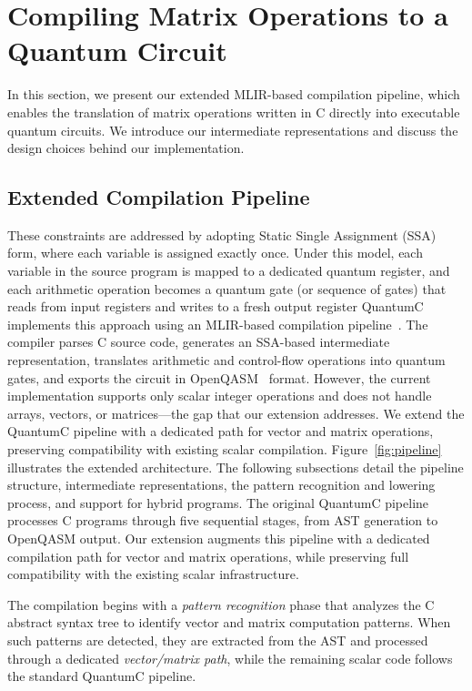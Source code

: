 \section{Compiling Matrix Operations to a Quantum Circuit}
In this section, we present our extended MLIR-based compilation pipeline, which enables the translation of matrix operations written in C directly into executable quantum circuits. We introduce our intermediate representations and discuss the design choices behind our implementation.

\subsection{Extended Compilation Pipeline}

\label{sec:compilation-pipeline}

These constraints are addressed by adopting Static Single Assignment (SSA) form, where each variable is assigned exactly once. Under this model, each variable in the source program is mapped to a dedicated quantum register, and each arithmetic operation becomes a quantum gate (or sequence of gates) that reads from input registers and writes to a fresh output register
QuantumC~\cite{quantumc} implements this approach using an MLIR-based compilation pipeline~\cite{mlir,xdsl}. The compiler parses C source code, generates an SSA-based intermediate representation, translates arithmetic and control-flow operations into quantum gates, and exports the circuit in OpenQASM~\cite{openqasm} format. However, the current implementation supports only scalar integer operations and does not handle arrays, vectors, or matrices---the gap that our extension addresses.
We extend the QuantumC pipeline with a dedicated path for vector and matrix operations, preserving compatibility with existing scalar compilation. Figure~\ref{fig:pipeline} illustrates the extended architecture. The following subsections detail the pipeline structure, intermediate representations, the pattern recognition and lowering process, and support for hybrid programs.
The original QuantumC pipeline processes C programs through five sequential stages, from AST generation to OpenQASM output. Our extension augments this pipeline with a dedicated compilation path for vector and matrix operations, while preserving full compatibility with the existing scalar infrastructure.

The compilation begins with a \emph{pattern recognition} phase that analyzes the C abstract syntax tree to identify vector and matrix computation patterns. When such patterns are detected, they are extracted from the AST and processed through a dedicated \emph{vector/matrix path}, while the remaining scalar code follows the standard QuantumC pipeline.

